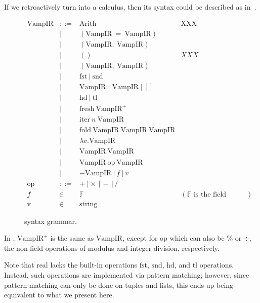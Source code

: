 \documentclass[
    9pt,            
    techreport,       
    affiltop,       
]{art}
\begin{document}
If we retroactively turn \VampIR{} into a calculus, then
its syntax could be described as in~.

\begin{figure}[!htb]
\begin{equation*}
\begin{array}{rclr}
    \text{VampIR} &::= &\text{Arith} &\text{XXX}\\
    &| &(\text{VampIR} \ = \ \text{VampIR}) &\\
    &| &(\text{VampIR};\ \text{VampIR}) &\\
    &| &() &XXX\\
    &| &(\text{VampIR},\ \text{VampIR}) &\\
    &| &\text{fst}\ |\ \text{snd} &\\
    &| &\text{VampIR}:: \text{VampIR}\ |\ [] &\\
    &| &\text{hd}\ |\ \text{tl} &\\
    &| &\text{fresh}\ \text{VampIR}^+ &\\
    &| &\text{iter}\ n\ \text{VampIR} &\\
    &| &\text{fold}\ \text{VampIR}\ \text{VampIR}\ \text{VampIR} &\\
    &| &\lambda v . \text{VampIR} &\\
    &| &\text{VampIR}\ \text{VampIR} &\\
    &| &\text{VampIR} \ \text{op} \ \text{VampIR} &\\
    &| &- \text{VampIR}\ |\ f\ |\ v &\\[2mm]
    \text{op} &::= &+ \,|\, \times \,|\, - \,|\, / &\\
    f &\in &\mathbb{F} &(\text{$\mathbb{F}$ is the field associated with the circuit.})\\
    \text{v} &\in &\text{string}
\end{array}
\end{equation*}
\caption{\VampIR{} syntax grammar.}
\label{fig:grammar}
\end{figure}

\begin{remark}
In , $\text{VampIR}^+$ is the same as $\text{VampIR}$, except for $\text{op}$ which can also be $\%$ or $\div$, the non-field operations of modulus and integer division, respectively.
\end{remark}

\begin{remark}
Note that real \VampIR{} lacks the built-in operations $\text{fst}$, $\text{snd}$, $\text{hd}$, and $\text{tl}$ operations. 
Instead, such operations are implemented via pattern matching; however, since pattern matching can only be done on tuples and lists, this ends up being equivalent to what we present here.
\end{remark}
\end{document}
